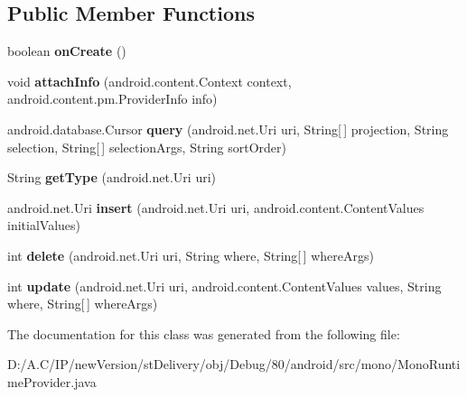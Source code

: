 \subsection*{Public Member Functions}
\begin{DoxyCompactItemize}
\item 
\mbox{\label{classmono_1_1_mono_runtime_provider_ac5640d3ce8472accc1953fe591e683c3}} 
boolean {\bfseries on\+Create} ()
\item 
\mbox{\label{classmono_1_1_mono_runtime_provider_a4fb9f5a38268fb642d211e7ef0fd9228}} 
void {\bfseries attach\+Info} (android.\+content.\+Context context, android.\+content.\+pm.\+Provider\+Info info)
\item 
\mbox{\label{classmono_1_1_mono_runtime_provider_a5f038667e16324d54f940968f4abd86f}} 
android.\+database.\+Cursor {\bfseries query} (android.\+net.\+Uri uri, String\mbox{[}$\,$\mbox{]} projection, String selection, String\mbox{[}$\,$\mbox{]} selection\+Args, String sort\+Order)
\item 
\mbox{\label{classmono_1_1_mono_runtime_provider_ab7978ccd79378f86aabc9a1997bff129}} 
String {\bfseries get\+Type} (android.\+net.\+Uri uri)
\item 
\mbox{\label{classmono_1_1_mono_runtime_provider_afbf0b2575d76132ac379064f3f695013}} 
android.\+net.\+Uri {\bfseries insert} (android.\+net.\+Uri uri, android.\+content.\+Content\+Values initial\+Values)
\item 
\mbox{\label{classmono_1_1_mono_runtime_provider_a20fd29ee82e2fbc6ca8e3a7d53e89b9f}} 
int {\bfseries delete} (android.\+net.\+Uri uri, String where, String\mbox{[}$\,$\mbox{]} where\+Args)
\item 
\mbox{\label{classmono_1_1_mono_runtime_provider_a70342b01de97d26ab215db961f4a714c}} 
int {\bfseries update} (android.\+net.\+Uri uri, android.\+content.\+Content\+Values values, String where, String\mbox{[}$\,$\mbox{]} where\+Args)
\end{DoxyCompactItemize}


The documentation for this class was generated from the following file\+:\begin{DoxyCompactItemize}
\item 
D\+:/\+A.\+C/\+I\+P/new\+Version/st\+Delivery/obj/\+Debug/80/android/src/mono/Mono\+Runtime\+Provider.\+java\end{DoxyCompactItemize}
